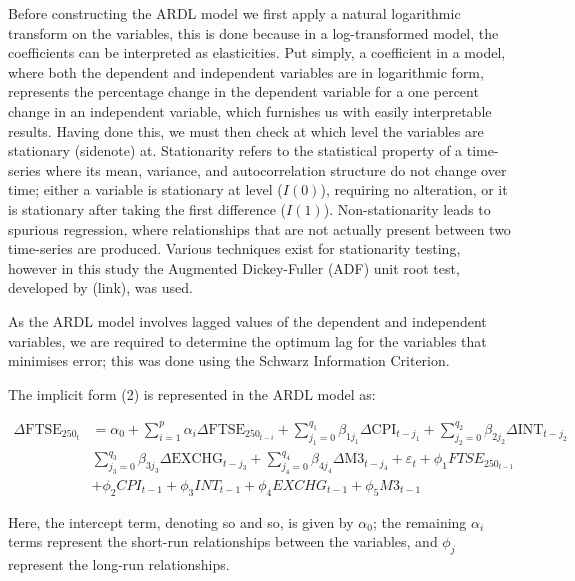 \documentclass[12pt,a4paper]{article}
\begin{document}
Before constructing the ARDL model we first apply a natural logarithmic transform
on the variables, this is done because in a log-transformed model,
the coefficients can be interpreted as elasticities. Put simply, 
a coefficient in a model, where both the dependent and independent variables
are in logarithmic form, represents the percentage change in the 
dependent variable for a one percent change in an independent variable, 
which furnishes us with easily interpretable results. Having done this,
we must then check at which level the variables are stationary (sidenote) at.
Stationarity refers to the statistical property of a time-series where 
its mean, variance, and autocorrelation structure do not change over time; 
either a variable is stationary at level ($I(0)$), requiring no alteration,
or it is stationary after taking the first difference ($I(1)$). 
Non-stationarity leads to spurious regression, where relationships that 
are not actually present between two time-series are produced. Various
techniques exist for stationarity testing, however in this study the 
Augmented Dickey-Fuller (ADF) unit root test, developed by (link), was used. 

As the ARDL model involves lagged values of the dependent and independent 
variables, we are required to determine the optimum lag for the variables 
that minimises error; this was done using the Schwarz
Information Criterion.

The implicit form (2) is represented in the ARDL model as:

\begin{align*}
    \Delta \text{FTSE}_{250_t} &= \alpha_0 + \sum_{i=1}^{p} \alpha_i \Delta \text{FTSE}_{250_{t-i}} + \sum_{j_{1}=0}^{q_1} \beta_{1j_{1}} \Delta \text{CPI}_{t-j_{1}} + \sum_{j_{2}=0}^{q_2} \beta_{2j_{2}} \Delta \text{INT}_{t-j_{2}} \\
                               & \sum_{j_{3}=0}^{q_3} \beta_{3j_{3}} \Delta \text{EXCHG}_{t-j_{3}} + \sum_{j_{4}=0}^{q_4} \beta_{4j_{4}} \Delta \text{M3}_{t-j_{4}} + \varepsilon_t + \phi_{1} FTSE_{250_{t-1}} \\
                               & + \phi_{2} CPI_{t-1} + \phi_{3} INT_{t-1} +\phi_4 EXCHG_{t-1} + \phi_5 M3_{t-1}
\end{align*}

Here, the intercept term, denoting so and so, is given by $\alpha_0$; the 
remaining $\alpha_i$ terms represent the short-run relationships 
between the variables, and $\phi_j$ represent the long-run relationships. 
\end{document}
